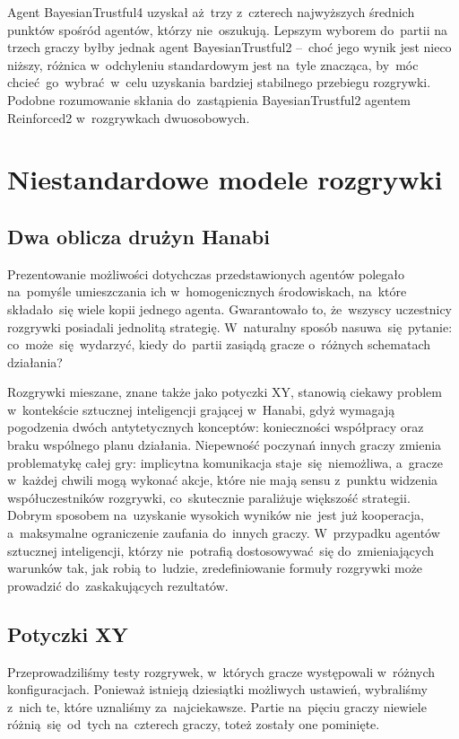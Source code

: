 \documentclass[declaration,shortabstract,inz]{iithesis}
\begin{document}
 Agent BayesianTrustful4 uzyskał aż~trzy z~czterech najwyższych średnich punktów spośród agentów, którzy nie~oszukują. Lepszym wyborem do~partii na trzech graczy byłby jednak agent BayesianTrustful2 --~choć jego wynik jest nieco niższy, różnica w~odchyleniu standardowym jest na~tyle znacząca, by~móc chcieć go~wybrać w~celu uzyskania bardziej stabilnego przebiegu rozgrywki. Podobne rozumowanie skłania do~zastąpienia BayesianTrustful2 agentem Reinforced2 w~rozgrywkach dwuosobowych.

\chapter{Niestandardowe modele rozgrywki}
\label{sec:xy}

\section{Dwa oblicza drużyn Hanabi}

Prezentowanie możliwości dotychczas przedstawionych agentów polegało na~pomyśle umieszczania ich w~homogenicznych środowiskach, na~które składało~się wiele kopii jednego agenta. Gwarantowało to, że~wszyscy uczestnicy rozgrywki posiadali jednolitą strategię. W~naturalny sposób nasuwa~się pytanie: co~może~się wydarzyć, kiedy do~partii zasiądą gracze o~różnych schematach działania?

Rozgrywki mieszane, znane także jako potyczki XY, stanowią ciekawy problem w~kontekście sztucznej inteligencji grającej w~Hanabi, gdyż wymagają pogodzenia dwóch antytetycznych konceptów: konieczności współpracy oraz braku wspólnego planu działania. Niepewność poczynań innych graczy zmienia problematykę całej gry: implicytna komunikacja staje~się niemożliwa, a~gracze w~każdej chwili mogą wykonać akcje, które nie mają sensu z~punktu widzenia współuczestników rozgrywki, co~skutecznie paraliżuje większość strategii. Dobrym sposobem na~uzyskanie wysokich wyników nie~jest już kooperacja, a~maksymalne ograniczenie zaufania do~innych graczy. W~przypadku agentów sztucznej inteligencji, którzy nie~potrafią dostosowywać~się do~zmieniających warunków tak, jak robią to~ludzie, zredefiniowanie formuły rozgrywki może prowadzić do~zaskakujących rezultatów.

\section{Potyczki XY}

Przeprowadziliśmy testy rozgrywek, w~których gracze występowali w~różnych konfiguracjach. Ponieważ istnieją dziesiątki możliwych ustawień, wybraliśmy z~nich te, które uznaliśmy za~najciekawsze. Partie na~pięciu graczy niewiele różnią~się od~tych na~czterech graczy, toteż zostały one pominięte.
\end{document}
